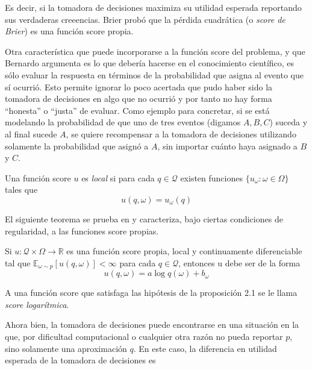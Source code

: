 \documentclass[main.tex]{subfiles}
\begin{document}
Es decir, si la tomadora de decisiones maximiza su utilidad esperada reportando sus verdaderas creeencias. Brier probó que la pérdida cuadrática (o \textit{score de Brier}) es una función score propia.

Otra característica que puede incorporarse a la función score del problema, y que Bernardo argumenta es lo que debería hacerse en el conocimiento científico, es sólo evaluar la respuesta en términos de la probabilidad que asigna al evento que sí ocurrió. Esto permite ignorar lo poco acertada que pudo haber sido la tomadora de decisiones en algo que no ocurrió y por tanto no hay forma \enquote{honesta} o \enquote{justa} de evaluar. Como ejemplo para concretar, si se está modelando la probabilidad de que uno de tres eventos (digamos $A, B, C$) suceda y al final sucede $A$, se quiere recompensar a la tomadora de decisiones utilizando solamente la probabilidad que asignó a $A$, sin importar cuánto haya asignado a $B$ y $C$. 

\begin{definition}
	Una función score $u$ es \textit{local} si para cada $q \in \mathcal{Q}$ existen funciones $\{u_\omega: \omega\in\Omega\}$ tales que
	\begin{equation*}
		u(q, \omega) = u_\omega(q)
	\end{equation*}
\end{definition}

El siguiente teorema se prueba en \cite{bernardo} y caracteriza, bajo ciertas condiciones de regularidad, a las funciones score propias.

\begin{prop}
	Si $u:\mathcal{Q}\times\Omega \to \mathbb{R}$ es una función score propia, local y continuamente diferenciable tal que $\mathbb{E}_{\omega \sim p}\left[u(q,\omega)\right] < \infty$ para cada $q \in \mathcal{Q}$, entonces u debe ser de la forma
	\begin{equation*}
		u(q, \omega) = a\log q(\omega)+b_\omega
	\end{equation*}
\end{prop} 

\begin{definition}
A una función score que satisfaga las hipótesis de la proposición 2.1 se le llama \textit{score logarítmica}.	
\end{definition}

Ahora bien, la tomadora de decisiones puede encontrarse en una situación en la que, por dificultad computacional o cualquier otra razón no pueda reportar $p$, sino solamente una aproximación $q$. En este caso, la diferencia en utilidad esperada de la tomadora de decisiones es 
\end{document}

